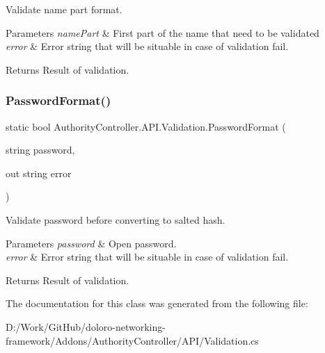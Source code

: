 Validate name part format. 


\begin{DoxyParams}{Parameters}
{\em name\+Part} & First part of the name that need to be validated\\
\hline
{\em error} & Error string that will be situable in case of validation fail.\\
\hline
\end{DoxyParams}
\begin{DoxyReturn}{Returns}
Result of validation.
\end{DoxyReturn}
\mbox{\label{class_authority_controller_1_1_a_p_i_1_1_validation_a9aceff242f489e5d63808e28b1506487}} 
\subsubsection{\texorpdfstring{Password\+Format()}{PasswordFormat()}}
{\footnotesize\ttfamily static bool Authority\+Controller.\+A\+P\+I.\+Validation.\+Password\+Format (\begin{DoxyParamCaption}\item[{string}]{password,  }\item[{out string}]{error }\end{DoxyParamCaption})\hspace{0.3cm}{\ttfamily [static]}}



Validate password before converting to salted hash. 


\begin{DoxyParams}{Parameters}
{\em password} & Open password.\\
\hline
{\em error} & Error string that will be situable in case of validation fail.\\
\hline
\end{DoxyParams}
\begin{DoxyReturn}{Returns}
Result of validation.
\end{DoxyReturn}


The documentation for this class was generated from the following file\+:\begin{DoxyCompactItemize}
\item 
D\+:/\+Work/\+Git\+Hub/doloro-\/networking-\/framework/\+Addons/\+Authority\+Controller/\+A\+P\+I/Validation.\+cs\end{DoxyCompactItemize}

